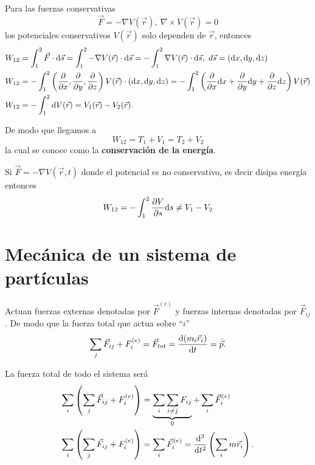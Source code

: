 \documentclass[../main]{subfiles}
\begin{document}
Para las fuerzas conservativas
\begin{equation}
    \vec{F}=-\nabla V(\vec{r}), \ \nabla \times V(\vec{r})=0
\end{equation}
los potenciales conservativos $V(\vec{r})$ solo dependen de $\vec{r}$, entonces
\begin{align}
    W_{12}&=\int_1^2 \vec{F}\cdot \mathrm{d}\vec{s}=\int_1^2 - \nabla V(\vec{r})\cdot \mathrm{d}\vec{s}=-\int_1^2 \nabla V(\vec{r})\cdot \mathrm{d}\vec{s}, \ d\vec{s}=(\mathrm{d}x, \mathrm{d}y, \mathrm{d}z)\\
    W_{12}&=-\int_1^2 \left(\pdv{}{x},\pdv{}{y}, \pdv{}{z}\right)V(\vec{r})\cdot (\mathrm{d}x, \mathrm{d}y, \mathrm{d}z)=-\int_1^2 \left(\pdv{}{x}\mathrm{d}x+\pdv{}{y}\mathrm{d}y+\pdv{}{z}\mathrm{d}z\right)V(\vec{r})\\
    W_{12}&=-\int_1^2 \mathrm{d}V(\vec{r})=V_1(\vec{r})-V_2(\vec{r}).
\end{align}

De modo que llegamos a 
\begin{equation}
    W_{12}=T_1+V_1=T_2+V_2
\end{equation}
la cual se conoce como la \textbf{conservación de la energía}.

Si $\vec{F}=-\nabla V(\vec{r},t)$ donde el potencial es no conservativo, es decir disipa energía entonces
\begin{equation}
    W_{12}=-\int_1^2 \pdv{V}{s}\mathrm{d}s\neq V_1-V_2 
\end{equation}

\section{Mecánica de un sistema de partículas}\label{sec2}

Actuan fuerzas externas denotadas por $\vec{F}^{(e)}$ y fuerzas internas denotadas por $\vec{F}_{ij}$. De modo que la fuerza total que actua sobre ``$i$''
\begin{equation}
    \sum_j \vec{F}_{ij}+F_i^{(e)}=\vec{F}_{tot}=\dv{(m_i \vec{r}_i)}{t}=\dot{\vec{p}}.
\end{equation}

La fuerza total de todo el sistema será
\begin{align}
    \sum_i\left(\sum_j \vec{F}_{ij}+F_i^{(e)}\right)&=\underbrace{\sum_i\sum_{i\neq j} F_{ij}}_{0}+\sum_i \vec{F}_i^{(e)}\\
    \sum_i\left(\sum_j \vec{F}_{ij}+F_i^{(e)}\right)&=\sum_i \vec{F}_i^{(e)}=\dv{^2}{t^2}\left(\sum_i m \vec{r}_i\right).
\end{align}
\end{document}
